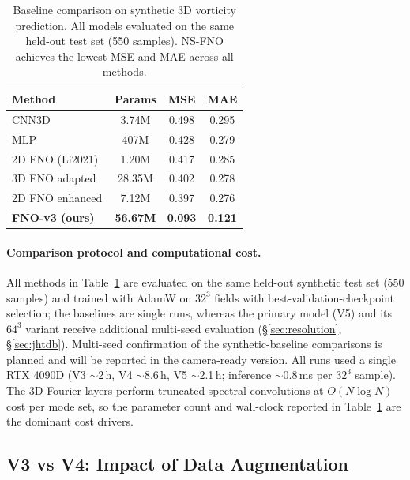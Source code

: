 \documentclass[review]{elsarticle}
\begin{document}
\begin{table}[t]
\centering
\caption{Baseline comparison on synthetic 3D vorticity prediction. All models evaluated on the same held-out test set (550 samples). NS-FNO achieves the lowest MSE and MAE across all methods.}
\label{tab:baseline}
\begin{tabular}{lccc}
\toprule
Method & Params & MSE & MAE \\
\midrule
CNN3D & 3.74M & 0.498 & 0.295 \\
MLP & 407M & 0.428 & 0.279 \\
2D FNO (Li2021)~\cite{li2021fourier} & 1.20M & 0.417 & 0.285 \\
3D FNO adapted & 28.35M & 0.402 & 0.278 \\
2D FNO enhanced & 7.12M & 0.397 & 0.276 \\
\textbf{FNO-v3 (ours)} & \textbf{56.67M} & \textbf{0.093} & \textbf{0.121} \\
\bottomrule
\end{tabular}
\end{table}

\paragraph{Comparison protocol and computational cost.}
All methods in Table~\ref{tab:baseline} are evaluated on the same held-out synthetic test set
(550 samples) and trained with AdamW on $32^3$ fields with best-validation-checkpoint
selection; the baselines are single runs, whereas the primary model (V5) and its $64^3$
variant receive additional multi-seed evaluation (\S\ref{sec:resolution},
\S\ref{sec:jhtdb}). Multi-seed confirmation of the synthetic-baseline comparisons is planned
and will be reported in the camera-ready version. All runs used a single RTX 4090D (V3
$\sim$2\,h, V4 $\sim$8.6\,h, V5 $\sim$2.1\,h; inference $\sim$0.8\,ms per $32^3$ sample). The
3D Fourier layers perform truncated spectral convolutions at $O(N\log N)$ cost per mode set,
so the parameter count and wall-clock reported in Table~\ref{tab:baseline} are the dominant
cost drivers.

\subsection{V3 vs V4: Impact of Data Augmentation}
\label{sec:v3v4}
\end{document}
